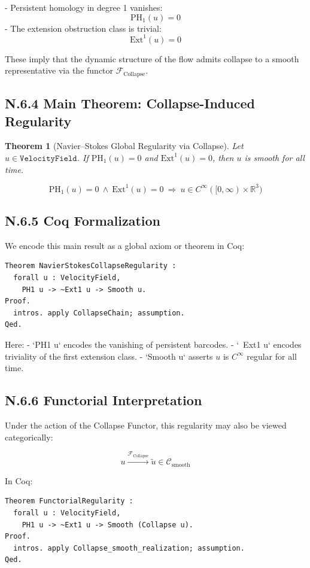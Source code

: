 \documentclass[11pt]{article}
\newtheorem{theorem}{Theorem}[section]
\begin{document}
- Persistent homology in degree 1 vanishes:
  \[
  \mathrm{PH}_1(u) = 0
  \]
- The extension obstruction class is trivial:
  \[
  \mathrm{Ext}^1(u) = 0
  \]

These imply that the dynamic structure of the flow admits collapse to a smooth representative via the functor $\mathcal{F}_{\mathrm{Collapse}}$.

\subsection*{N.6.4 Main Theorem: Collapse-Induced Regularity}

\begin{theorem}[Navier–Stokes Global Regularity via Collapse]
Let $u \in \texttt{VelocityField}$.  
If $\mathrm{PH}_1(u) = 0$ and $\mathrm{Ext}^1(u) = 0$,  
then $u$ is smooth for all time.

\[
\mathrm{PH}_1(u) = 0 \ \wedge\ \mathrm{Ext}^1(u) = 0\ \Rightarrow\ u \in C^\infty([0,\infty) \times \mathbb{R}^3)
\]
\end{theorem}

\subsection*{N.6.5 Coq Formalization}

We encode this main result as a global axiom or theorem in Coq:

\begin{verbatim}
Theorem NavierStokesCollapseRegularity :
  forall u : VelocityField,
    PH1 u -> ~Ext1 u -> Smooth u.
Proof.
  intros. apply CollapseChain; assumption.
Qed.
\end{verbatim}

Here:
- `PH1 u` encodes the vanishing of persistent barcodes.
- `~Ext1 u` encodes triviality of the first extension class.
- `Smooth u` asserts $u$ is $C^\infty$ regular for all time.

\subsection*{N.6.6 Functorial Interpretation}

Under the action of the Collapse Functor, this regularity may also be viewed categorically:

\[
u \xrightarrow{\mathcal{F}_{\mathrm{Collapse}}} \widetilde{u} \in \mathcal{C}_{\mathrm{smooth}}
\]

In Coq:

\begin{verbatim}
Theorem FunctorialRegularity :
  forall u : VelocityField,
    PH1 u -> ~Ext1 u -> Smooth (Collapse u).
Proof.
  intros. apply Collapse_smooth_realization; assumption.
Qed.
\end{verbatim}
\end{document}
